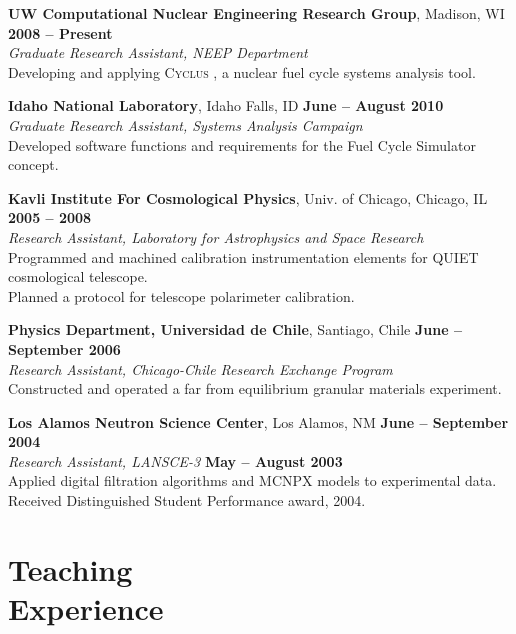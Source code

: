 \documentclass[margin,line]{resume}
\newcommand{\Cyclus}{\textsc{Cyclus }}
\begin{document}
\begin{resume}
    \textbf{UW Computational Nuclear Engineering Research Group}, Madison, WI \hfill \textbf{2008 -- Present}\\
		\textsl{Graduate Research Assistant, NEEP Department}\\ 
		Developing and applying \Cyclus, a nuclear fuel cycle systems analysis tool.

    \textbf{Idaho National Laboratory}, Idaho Falls, ID \hfill \textbf{June -- August 2010}\\
		\textsl{Graduate Research Assistant, Systems Analysis Campaign}\\ 
		Developed software functions and requirements for the Fuel Cycle Simulator concept.

    \textbf{Kavli Institute For Cosmological Physics}, Univ. of Chicago, Chicago, IL \hfill \textbf{2005 -- 2008}\\
                \textsl{Research Assistant, Laboratory for Astrophysics and Space Research}\\
                Programmed and machined calibration instrumentation elements for QUIET cosmological telescope.\\
                Planned a protocol for telescope polarimeter calibration.

    \textbf{Physics Department, Universidad de Chile}, Santiago, Chile \hfill \textbf{June -- September 2006}\\
                \textsl{Research Assistant, Chicago-Chile Research Exchange Program}\\
                 Constructed and operated a far from equilibrium granular materials experiment.

    \textbf{Los Alamos Neutron Science Center}, Los Alamos, NM \hfill \textbf{June -- September 2004}\\ 
                \textsl{Research Assistant, LANSCE-3} \hfill \textbf{May -- August 2003}\\
                Applied digital filtration algorithms and MCNPX models to experimental data.\\
		Received Distinguished Student Performance award, 2004.
    \section{\mysidestyle Teaching\\Experience}


\end{resume}
\end{document}

